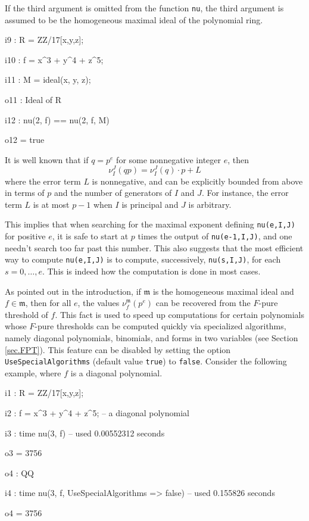 \documentclass{amsart}
\begin{document}
If the third argument is omitted from the function {\tt nu}, the third argument is assumed to be the homogeneous maximal ideal of the polynomial ring. 

{\small
{}
\begin{MyVerbatim}

i9 : R = ZZ/17[x,y,z];

i10 : f = x^3 + y^4 + z^5;

i11 : M = ideal(x, y, z);

o11 : Ideal of R

i12 : nu(2, f) == nu(2, f, M)

o12 = true
\end{MyVerbatim}
}
\medspace


It is well known that if $q=p^e$ for some nonnegative integer $e$, then \[ \nu_I^J(qp) = \nu_I^J(q)\cdot p + L\]  where the error term $L$ is nonnegative, and can be explicitly bounded from above in terms of $p$ and the number of generators of $I$ and $J$.  For instance, the error term $L$ is at most $p-1$ when $I$ is principal and $J$ is arbitrary.

This implies that when searching for the maximal exponent defining {\tt nu(e,I,J)} for positive $e$, it is safe to start at $p$ times the output of {\tt nu(e-1,I,J)}, and one needn't search too far past this number.  This also suggests that the most efficient way to compute {\tt nu(e,I,J)} is to compute, successively, {\tt nu(s,I,J)}, for each $s = 0,\ldots,e$.  This is indeed how the computation is done in most cases.  

As pointed out in the introduction, if $\mathfrak{m}$ is the homogeneous maximal ideal and $f \in \mathfrak{m}$, then for all $e$, the values $\nu^{\mathfrak{m}}_f(p^e)$ can be recovered from the $F$-pure threshold of $f$.  
This fact is used to speed up computations for certain polynomials whose $F$-pure thresholds can be computed quickly via specialized algorithms, namely diagonal polynomials, binomials, and forms in two variables (see Section \ref{sec.FPT}).  This feature can be disabled by setting the option {\tt UseSpecialAlgorithms} (default value {\tt true}) to {\tt false}.  Consider the following example, where $f$ is a diagonal polynomial.

{\small
{}
\begin{MyVerbatim}

i1 : R = ZZ/17[x,y,z];

i2 : f = x^3 + y^4 + z^5; -- a diagonal polynomial

i3 : time nu(3, f)
     -- used 0.00552312 seconds

o3 = 3756

o4 : QQ

i4 : time nu(3, f, UseSpecialAlgorithms => false)
     -- used 0.155826 seconds

o4 = 3756
\end{MyVerbatim}
}
\medspace
\end{document}
